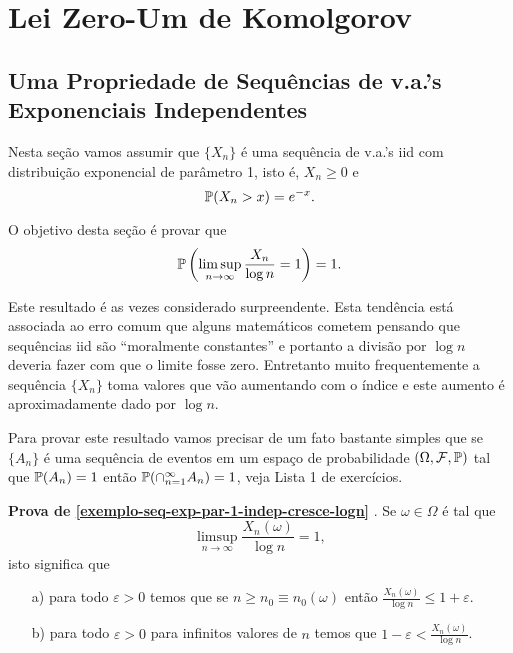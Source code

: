 \chapter[Aula 8]{Lei Zero-Um de Komolgorov}
\chaptermark{}

\section{Uma Propriedade de Sequências de v.a.'s Exponenciais Independentes}
\label{secao-props-va-exp-indep}

Nesta seção vamos assumir que $\{X_n\}$ é uma sequência 
de v.a.'s iid com distribuição exponencial de parâmetro 1,
isto é, $X_n\geq 0$ e  
\[
	\P(X_n>x)=e^{-x}.
\] 

O objetivo desta seção é provar que 
%
	\begin{equation}\label{exemplo-seq-exp-par-1-indep-cresce-logn}
		\P
		\left(
			\limsup_{n\to\infty}
			\frac{X_n}{\log n} 
			=1
		\right)	
		=1.
	\end{equation}

Este resultado é as vezes considerado surpreendente.
Esta tendência está associada ao erro comum que alguns
matemáticos cometem pensando que sequências iid 
são ``moralmente constantes'' e portanto a divisão 
por $\log n$ deveria fazer com que o limite fosse
zero. 
Entretanto muito frequentemente a sequência $\{X_n\}$
toma valores que vão aumentando com o índice e 
este aumento é aproximadamente dado por $\log n$.

Para provar este resultado vamos precisar de um fato 
bastante simples que se $\{A_n\}$ é uma sequência 
de eventos em um espaço de probabilidade $(\Omega,\F,\P)$
tal que $\P(A_n)=1$ então $\P(\cap_{n=1}^{\infty} A_n)=1$,
veja Lista 1 de exercícios.


\medskip

\noindent
{\bf Prova de \eqref{exemplo-seq-exp-par-1-indep-cresce-logn} }.
Se $\omega\in \Omega$ é tal que 
	\[
		\limsup_{n\to\infty}
		\frac{X_n(\omega)}{\log n} 
		=1,
	\]
isto significa que 
\begin{itemize}
	\item[a)]
	para todo $\varepsilon>0$ temos que se $n\geq n_0\equiv n_0(\omega)$ então
	$\displaystyle\frac{X_n(\omega)}{\log n}\leq 1+\varepsilon$.
	
	
	\item[b)]
	para todo $\varepsilon>0$ para infinitos valores de $n$ 
	temos que 	
	$1-\varepsilon<\displaystyle\frac{X_n(\omega)}{\log n}$.
		
\end{itemize}




